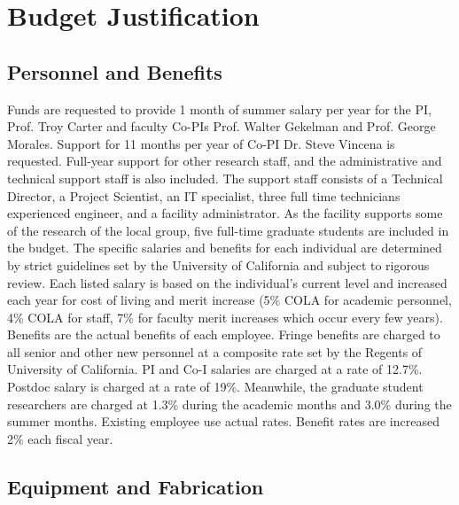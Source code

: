 \documentclass[11pt]{article}
\date{}
\begin{document}
\section*{Budget Justification}

\subsection*{Personnel and Benefits}

Funds are requested to provide 1 month of summer salary per year for the PI,
Prof. Troy Carter and faculty Co-PIs Prof. Walter Gekelman and
Prof. George Morales.  Support for 11 months per year of Co-PI Dr. Steve
Vincena is requested.  Full-year support for other research staff, and
the administrative and technical support staff is also included. The
support staff consists of a Technical Director, a Project Scientist,
an IT specialist, three full time technicians experienced engineer,
and a facility administrator. As the facility supports some of the
research of the local group, five full-time graduate students are
included in the budget.  The specific salaries and benefits for each
individual are determined by strict guidelines set by the University
of California and subject to rigorous review. Each listed salary is
based on the individual’s current level and increased each year for
cost of living and merit increase (5\% COLA for academic personnel,
4\% COLA for staff, 7\% for faculty merit increases which occur every
few years). Benefits are the actual benefits of each employee.  Fringe
benefits are charged to all senior and other new personnel at a
composite rate set by the Regents of University of California.  PI and
Co-I salaries are charged at a rate of 12.7\%. Postdoc salary is
charged at a rate of 19\%. Meanwhile, the graduate student researchers
are charged at 1.3\% during the academic months and 3.0\% during the
summer months.  Existing employee use actual rates.  Benefit rates are
increased 2\% each fiscal year.




\subsection*{Equipment and Fabrication}
\end{document}
